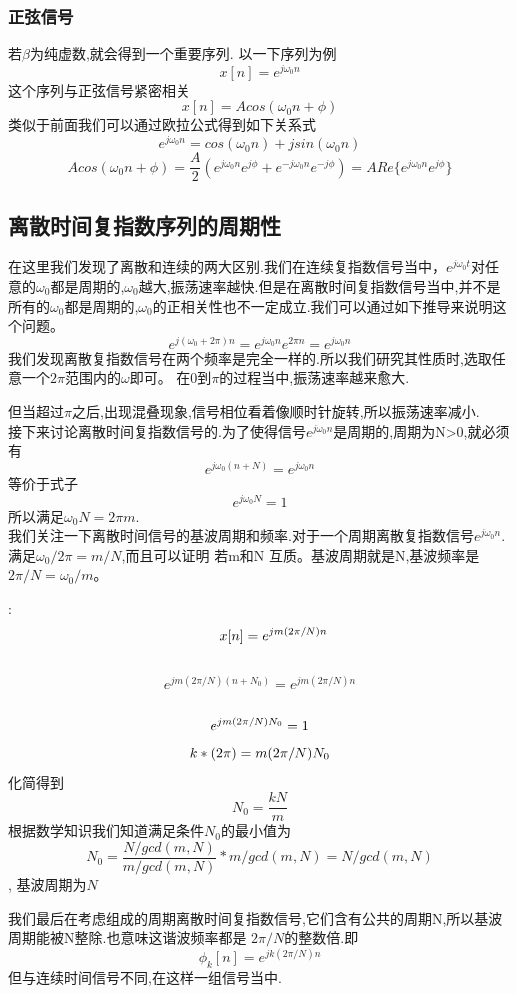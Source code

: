 \subsubsection{正弦信号}\par
若$\beta$为纯虚数,就会得到一个重要序列.
以一下序列为例
\[
x[n]=e^{j\omega_0 n}
\]
这个序列与正弦信号紧密相关
\[
x[n]=Acos(\omega_0 n+\phi)
\]
类似于前面我们可以通过欧拉公式得到如下关系式
\[
e^{j\omega_0 n}=cos(\omega_0 n)+j sin(\omega_0 n)
\]
\[
Acos(\omega_0 n+\phi)=\frac{A}{2}(e^{j\omega_0 n} e^{j\phi}+e^{-j\omega_0 n} e^{-j\phi})=A Re\{e^{j\omega_0 n} e^{j\phi}\}
\]
\subsection{离散时间复指数序列的周期性}\par
在这里我们发现了离散和连续的两大区别.我们在连续复指数信号当中，$e^{j\omega_0 t}$对任意的$\omega_0$都是周期的,$\omega_0$越大,振荡速率越快.但是在离散时间复指数信号当中,并不是所有的$\omega_0$都是周期的,$\omega_0$的正相关性也不一定成立.我们可以通过如下推导来说明这个问题。
\begin{equation*}
    e^{j(\omega_0+2\pi)n}=e^{j\omega_0 n}e^{2\pi n}=e^{j\omega_0 n}
\end{equation*}
\qquad 我们发现离散复指数信号在两个频率是完全一样的.所以我们研究其性质时,选取任意一个$2\pi$范围内的$\omega$即可。
在0到$\pi$的过程当中,振荡速率越来愈大.\par 但当超过$\pi$之后,出现混叠现象,信号相位看着像顺时针旋转,所以振荡速率减小.\\
\qquad 接下来讨论离散时间复指数信号的.为了使得信号$e^{j\omega_0 n}$是周期的,周期为N>0,就必须有
\[
e^{j\omega_0 (n+N)}=e^{j\omega_0 n}
\]
等价于式子
\begin{equation}
     e^{j\omega_0 N}=1
\end{equation}
所以满足$\omega_0 N=2\pi m$.\\
\qquad 我们关注一下离散时间信号的基波周期和频率.对于一个周期离散复指数信号$e^{j\omega_0 n}$.满足$\omega_0/2\pi=m/N$,而且可以证明
若m和N 互质。基波周期就是N,基波频率是$2\pi/N=\omega_0/m$。
\begin{note}
    :\\
    \[
    \qquad  x[n]=e^{jm(2\pi/N)n}\\
    \]
    \\
    \[e^{jm(2\pi/N)(n+N_0)}=e^{jm(2\pi/N)n}\]\\
    \[e^{jm(2\pi/N)N_0}=1\\\]
    \[
    k*(2\pi)=m(2\pi/N)N_0\\
    \]
    化简得到
    \[N_0=\frac{kN}{m}\]
根据数学知识我们知道满足条件$N_0$的最小值为
\[
N_0=\frac{N/gcd(m,N)}{m/gcd(m,N)}*m/gcd(m,N)=N/gcd(m,N)
\]
, 基波周期为$N$
\end{note}
\qquad  我们最后在考虑组成的周期离散时间复指数信号,它们含有公共的周期N,所以基波周期能被N整除.也意味这谐波频率都是
$2\pi/N$的整数倍.即
\[\phi_k[n]=e^{jk(2\pi/N)n}\]
\qquad 但与连续时间信号不同,在这样一组信号当中.

